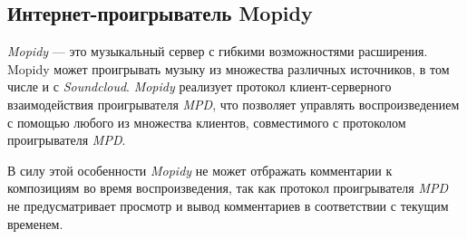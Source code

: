 \subsection{Интернет-проигрыватель Mopidy}


\textit{Mopidy}\cite{mopidy:main} --- это музыкальный сервер с гибкими
возможностями расширения. Mopidy может проигрывать музыку из множества
различных источников, в том числе и с \textit{Soundcloud}. \textit{Mopidy} реализует
протокол клиент-серверного взаимодействия проигрывателя \textit{MPD},
что позволяет управлять воспроизведением с помощью любого из
множества клиентов, совместимого с протоколом проигрывателя \textit{MPD}.


В силу этой особенности \textit{Mopidy} не может отбражать комментарии
к композициям во время воспроизведения, так как  протокол
проигрывателя \textit{MPD} не предусматривает просмотр и вывод
комментариев в соответствии с текущим временем. 

